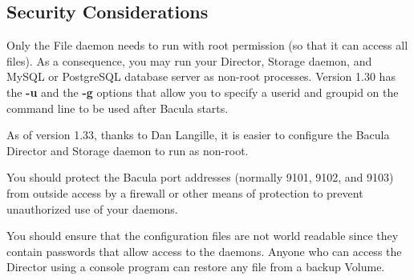 \subsection*{Security Considerations}
\label{security}

Only the File daemon needs to run with root permission (so that it can access
all files). As a consequence, you may run your Director, Storage daemon, and
MySQL or PostgreSQL database server as non-root processes. Version 1.30 has
the {\bf -u} and the {\bf -g} options that allow you to specify a userid and
groupid on the command line to be used after Bacula starts. 

As of version 1.33, thanks to Dan Langille, it is easier to configure the
Bacula Director and Storage daemon to run as non-root. 

You should protect the Bacula port addresses (normally 9101, 9102, and 9103)
from outside access by a firewall or other means of protection to prevent
unauthorized use of your daemons. 

You should ensure that the configuration files are not world readable since
they contain passwords that allow access to the daemons. Anyone who can access
the Director using a console program can restore any file from a backup
Volume. 

